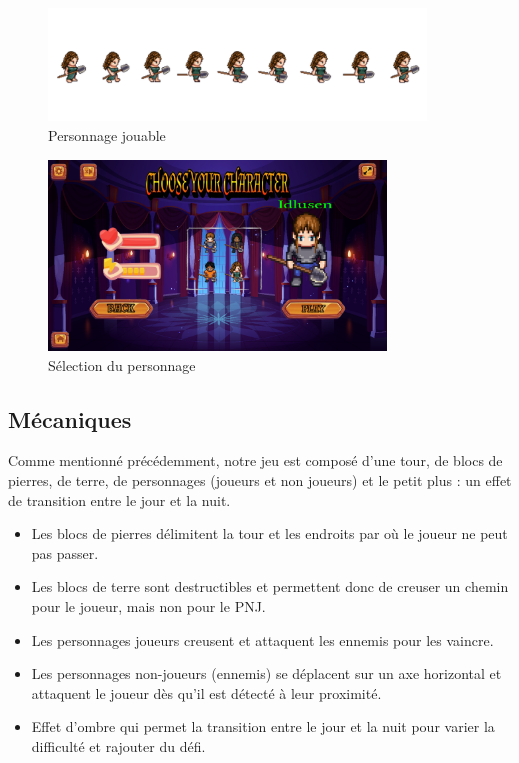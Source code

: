 \documentclass[a4paper,12pt]{article}
\begin{document}
\begin{figure}[h]
	\centering
	\includegraphics[height=3cm]{img/exemple_personnage_jouable.png}
	\caption{Personnage jouable}
	\label{personnage jouable}
\end{figure}

\begin{figure}[H]
	\centering
	\includegraphics[width=0.8\textwidth]{img/ecran_selection.png}
	\caption{Sélection du personnage}
	\label{selection_personnage}
\end{figure}

\subsection{Mécaniques}
Comme mentionné précédemment, notre jeu est composé d'une tour, de blocs de pierres, de terre, de personnages (joueurs et non joueurs) et le petit plus : un effet de transition entre le jour et la nuit.
\begin{itemize}
	\item Les blocs de pierres délimitent la tour et les endroits par où le joueur ne peut pas passer.
	\item Les blocs de terre sont destructibles et permettent donc de creuser un chemin pour le joueur, mais non pour le PNJ.
	\item Les personnages joueurs creusent et attaquent les ennemis pour les vaincre.
	\item Les personnages non-joueurs (ennemis) se déplacent sur un axe horizontal et attaquent le joueur dès qu'il est détecté à leur proximité.
	\item Effet d'ombre qui permet la transition entre le jour et la nuit pour varier la difficulté et rajouter du défi.
\end{itemize}
\end{document}
